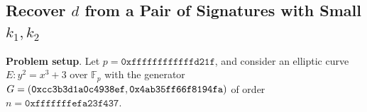 \documentclass[a4paper,12pt]{report}
\newcommand{\F}{\mathbb{F}}
\begin{document}
% 
% 
% 
% 
% 
% 
% 
% 
% 
% 
% 
% 
% 
% 
% 
% 
% 


\subsection{Recover $d$ from a Pair of Signatures with Small $k_1, k_2$}

\textbf{Problem setup}.
Let $p = \texttt{0xffffffffffffd21f}$, and consider an elliptic curve $E: y^2 = x^3 + 3$ over $\F_p$ with the generator
$G = (\texttt{0xcc3b3d1a0c4938ef}, \\ \texttt{0x4ab35ff66f8194fa})$ of order $n = \texttt{0xfffffffefa23f437}$.
\end{document}
